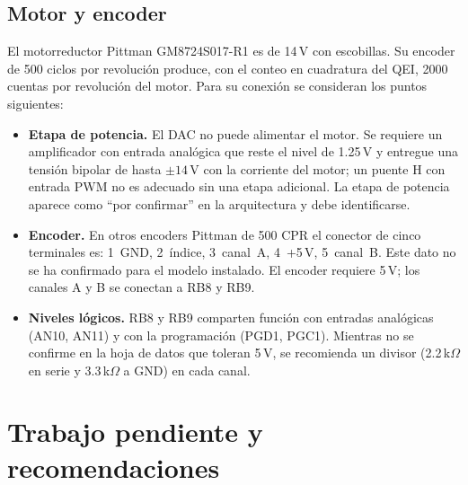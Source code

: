 \documentclass[11pt]{article}
\begin{document}
\subsection{Motor y encoder}

El motorreductor Pittman GM8724S017-R1 es de 14\,V con escobillas. Su
encoder de 500 ciclos por revolución produce, con el conteo en cuadratura
del QEI, 2000 cuentas por revolución del motor. Para su conexión se
consideran los puntos siguientes:

\begin{itemize}
\item \textbf{Etapa de potencia.} El DAC no puede alimentar el motor. Se
  requiere un amplificador con entrada analógica que reste el nivel de
  1.25\,V y entregue una tensión bipolar de hasta $\pm14$\,V con la corriente
  del motor; un puente H con entrada PWM no es adecuado sin una etapa
  adicional. La etapa de potencia aparece como ``por confirmar'' en la
  arquitectura y debe identificarse.
\item \textbf{Encoder.} En otros encoders Pittman de 500 CPR el conector de
  cinco terminales es: 1~GND, 2~índice, 3~canal~A, 4~+5\,V, 5~canal~B. Este
  dato no se ha confirmado para el modelo instalado. El encoder requiere
  5\,V; los canales A y B se conectan a RB8 y RB9.
\item \textbf{Niveles lógicos.} RB8 y RB9 comparten función con entradas
  analógicas (AN10, AN11) y con la programación (PGD1, PGC1). Mientras no se
  confirme en la hoja de datos que toleran 5\,V, se recomienda un divisor
  (2.2\,k$\Omega$ en serie y 3.3\,k$\Omega$ a GND) en cada canal.
\end{itemize}

\section{Trabajo pendiente y recomendaciones}
\end{document}
